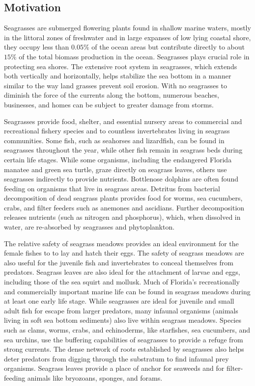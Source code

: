 \documentclass[12pt]{report}   %
\begin{document}
\subsection{Motivation}
Seagrasses are submerged flowering plants found in shallow marine waters, mostly in the littoral zones of freshwater and in large expanses of low lying coastal shore, they occupy less than $0.05\%$ of the ocean areas but contribute directly to about $15\%$ of the total biomass production in the ocean. Seagrasses plays crucial role in protecting sea shores. The extensive root system in seagrasses, which extends both vertically and horizontally, helps stabilize the sea bottom in a manner similar to the way land grasses prevent soil erosion. With no seagrasses to diminish the force of the currents along the bottom, numerous beaches, businesses, and homes can be subject to greater damage from storms.

Seagrasses provide food, shelter, and essential nursery areas to commercial and recreational fishery species and to countless invertebrates living in seagrass communities.
Some fish, such as seahorses and lizardfish, can be found in seagrasses throughout the year, while other fish remain in seagrass beds during certain life stages. While some organisms, including the endangered Florida manatee and green sea turtle, graze directly on seagrass leaves, others use seagrasses indirectly to provide nutrients. Bottlenose dolphins are often found feeding on organisms that live in seagrass areas. Detritus from bacterial decomposition of dead seagrass plants provides food for worms, sea cucumbers, crabs, and filter feeders such as anemones and ascidians. Further decomposition releases nutrients (such as nitrogen and phosphorus), which, when dissolved in water, are re-absorbed by seagrasses and phytoplankton.

The relative safety of seagrass meadows provides an ideal environment for the female fishes to to lay and hatch their eggs. The safety of seagrass meadows are also useful for the juvenile fish and invertebrates to conceal themselves from predators. Seagrass leaves are also ideal for the attachment of larvae and eggs, including those of the sea squirt and mollusk. Much of Florida's recreationally and commercially important marine life can be found in seagrass meadows during at least one early life stage. While seagrasses are ideal for juvenile and small adult fish for escape from larger predators, many infaunal organisms (animals living in soft sea bottom sediments) also live within seagrass meadows. Species such as clams, worms, crabs, and echinoderms, like starfishes, sea cucumbers, and sea urchins, use the buffering capabilities of seagrasses to provide a refuge from strong currents. The dense network of roots established by seagrasses also helps deter predators from digging through the substratum to find 
infaunal prey organisms. Seagrass leaves provide a place of anchor for seaweeds and for filter-feeding animals like bryozoans, sponges, and forams.
\end{document}

